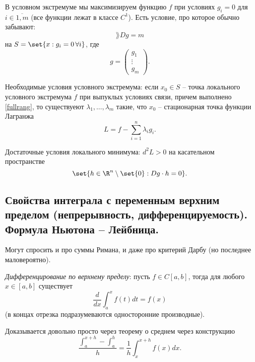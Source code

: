 В условном экстремуме мы максимизируем функцию $f$ при условиях $g_i = 0$ для $i \in \overline{1, m}$ (все функции лежат в классе $C^1$). Есть условие, про которое обычно забывают: 
\begin{equation}
    \rang Dg = m \tag{$**$} \label{fullrang}
\end{equation}
на $S = \set{x: g_i = 0 \, \forall i}$, где
\begin{equation*}
    g = \begin{pmatrix}
        g_1 \\ \vdots \\ g_m
    \end{pmatrix}.
\end{equation*}

Необходимые условия условного экстремума: если $x_0 \in S$ -- точка локального условного экстремума $f$ при выпуклых условиях связи, причем выполнено \eqref{fullrang}, то существуеют $\lambda_1, \ldots, \lambda_m$ такие, что $x_0$ -- стационарная точка функции Лагранжа
\begin{equation*}
    L = f - \sum_{i = 1}^n \lambda_ig_i.
\end{equation*}

Достаточные условия локального минимума: $d^2L > 0$ на касательном пространстве
\begin{equation*}
    \set{h \in \R^n\setminus \set{0} : Dg \cdot h = 0}.
\end{equation*}

\subsection{Свойства интеграла с переменным верхним пределом (непрерывность,
дифференцируемость). Формула Ньютона -- Лейбница.}

Могут спросить и про суммы Римана, и даже про критерий Дарбу (но последнее маловероятно).

\textit{Дифференцирование по верхнему пределу}: пусть $f \in C[a, b]$, тогда для любого $x \in [a, b]$ существует
\begin{equation*}
    \frac{d}{dx} \int_a^x f(t) dt = f(x)
\end{equation*}
(в концах отрезка подразумеваются односторонние производные).

Доказывается довольно просто через теорему о среднем через конструкцию
\begin{equation*}
    \frac{\int_a^{x + h} - \int_a^h}{h} = \frac{1}{h} \int_x^{x + h} f(x) dx.
\end{equation*}


